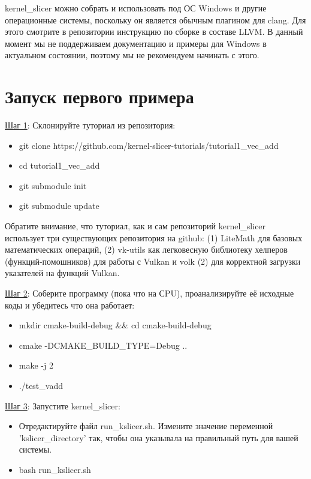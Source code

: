 \documentclass[11pt,fleqn,english,russian]{report} %
\begin{document}
\begin{remark}
	kernel\_slicer можно собрать и использовать под ОС Windows и другие операционные системы, поскольку он является обычным плагином для clang. Для этого смотрите в репозитории инструкцию по сборке в составе LLVM. В данный момент мы не поддерживаем документацию и примеры для Windows в актуальном состоянии, поэтому мы не рекомендуем начинать с этого. 
\end{remark}

\pagebreak
\section{Запуск первого примера}

\underline{Шаг 1}: Склонируйте туториал из репозитория:

\begin{itemize}
	\item git clone https://github.com/kernel-slicer-tutorials/tutorial1\_vec\_add
	\item cd tutorial1\_vec\_add
	\item git submodule init
	\item git submodule update
\end{itemize}

\vspace*{5px}
Обратите внимание, что туториал, как и сам репозиторий kernel\_slicer использует три существующих репозитория на github: (1) LiteMath для базовых математических операций, (2) vk-utils как легковесную библиотеку хелперов (функций-помошников) для работы с Vulkan и volk (2) для корректной загрузки указателей на функций Vulkan.

\vspace*{5px}
\noindent\underline{Шаг 2}: Соберите программу (пока что на СPU), проанализируйте её исходные коды и убедитесь что она работает: 
\begin{itemize}
	\item mkdir cmake-build-debug \&\& cd cmake-build-debug
	\item cmake -DCMAKE\_BUILD\_TYPE=Debug ..
	\item make -j 2
	\item ./test\_vadd 
\end{itemize}

\vspace*{5px}
\noindent\underline{Шаг 3}: Запустите kernel\_slicer:
\begin{itemize}
	\item Отредактируйте файл run\_kslicer.sh. Измените значение переменной 'kslicer\_directory' так, чтобы она указывала на правильный путь для вашей системы.
	\item bash run\_kslicer.sh 
\end{itemize}
\end{document}

